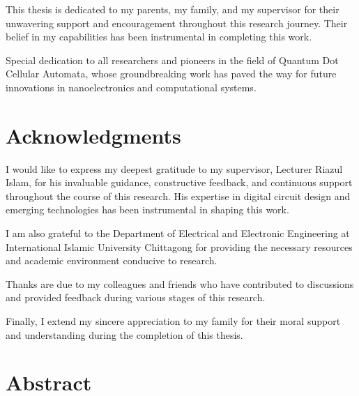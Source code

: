 \documentclass[12pt,a4paper,twoside]{report}
\begin{document}
\vspace{3cm}

\begin{center}
\large
This thesis is dedicated to my parents, my family, and my supervisor for their unwavering support and encouragement throughout this research journey. Their belief in my capabilities has been instrumental in completing this work.

\vspace{1cm}

Special dedication to all researchers and pioneers in the field of Quantum Dot Cellular Automata, whose groundbreaking work has paved the way for future innovations in nanoelectronics and computational systems.
\end{center}

\chapter*{Acknowledgments}

I would like to express my deepest gratitude to my supervisor, Lecturer Riazul Islam, for his invaluable guidance, constructive feedback, and continuous support throughout the course of this research. His expertise in digital circuit design and emerging technologies has been instrumental in shaping this work.

I am also grateful to the Department of Electrical and Electronic Engineering at International Islamic University Chittagong for providing the necessary resources and academic environment conducive to research.

Thanks are due to my colleagues and friends who have contributed to discussions and provided feedback during various stages of this research.

Finally, I extend my sincere appreciation to my family for their moral support and understanding during the completion of this thesis.

\chapter*{Abstract}
\end{document}
